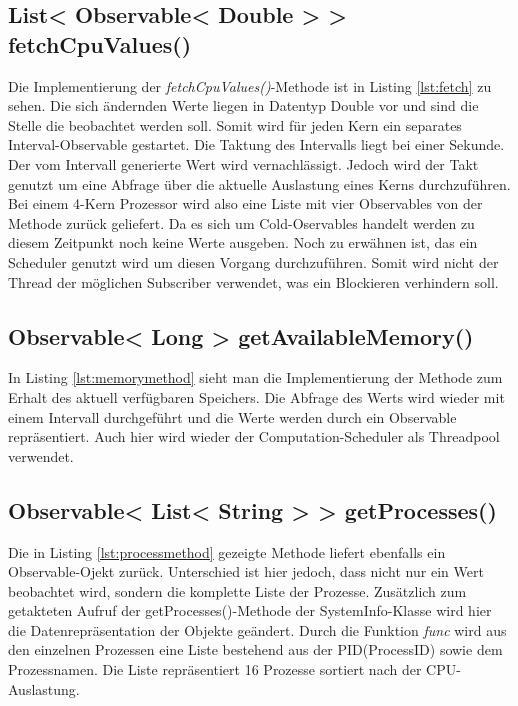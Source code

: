 \subsection{List< Observable< Double > > fetchCpuValues()}
 
Die Implementierung der \textit{fetchCpuValues()}-Methode ist in Listing \ref{lst:fetch} zu sehen. Die sich ändernden Werte liegen in Datentyp Double vor und sind die Stelle die beobachtet werden soll. Somit wird für jeden Kern ein separates Interval-Observable gestartet. Die Taktung des Intervalls liegt bei einer Sekunde. Der vom Intervall generierte Wert wird vernachlässigt. Jedoch wird der Takt genutzt um eine Abfrage über die aktuelle Auslastung eines Kerns durchzuführen. Bei einem 4-Kern Prozessor wird also eine Liste mit vier Observables von der Methode zurück geliefert. Da es sich um Cold-Oservables handelt werden zu diesem Zeitpunkt noch keine Werte ausgeben. Noch zu erwähnen ist, das ein Scheduler genutzt wird um diesen Vorgang durchzuführen. Somit wird nicht der Thread der möglichen Subscriber verwendet, was ein Blockieren verhindern soll. 
\subsection{Observable< Long > getAvailableMemory()}
 
In Listing \ref{lst:memorymethod} sieht man die Implementierung der Methode zum Erhalt des aktuell verfügbaren Speichers. Die Abfrage des Werts wird wieder mit einem Intervall durchgeführt und die Werte werden durch ein Observable repräsentiert. Auch hier wird wieder der Computation-Scheduler als Threadpool verwendet.
\subsection{Observable< List< String > > getProcesses()}
 
Die in Listing \ref{lst:processmethod} gezeigte Methode liefert ebenfalls ein Observable-Ojekt zurück. Unterschied ist hier jedoch, dass nicht nur ein Wert beobachtet wird, sondern die komplette Liste der Prozesse. Zusätzlich zum getakteten Aufruf der getProcesses()-Methode der SystemInfo-Klasse wird hier die Datenrepräsentation der Objekte geändert. Durch die Funktion \textit{func} wird aus den einzelnen Prozessen eine Liste bestehend aus der PID(ProcessID) sowie dem Prozessnamen. Die Liste repräsentiert 16 Prozesse sortiert nach der CPU-Auslastung.
